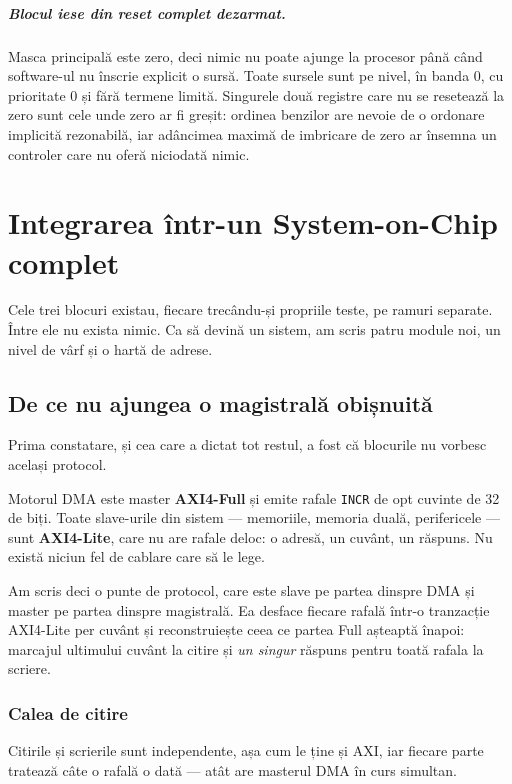 \documentclass[11pt,openany]{report}
\newcommand{\sig}[1]{\texttt{#1}}
\begin{document}
\paragraph{Blocul iese din reset complet dezarmat.} Masca principală este zero,
deci nimic nu poate ajunge la procesor până când software-ul nu înscrie explicit
o sursă. Toate sursele sunt pe nivel, în banda 0, cu prioritate 0 și fără
termene limită. Singurele două registre care nu se resetează la zero sunt cele
unde zero ar fi greșit: ordinea benzilor are nevoie de o ordonare implicită
rezonabilă, iar adâncimea maximă de imbricare de zero ar însemna un controler
care nu oferă niciodată nimic.

\chapter{Integrarea într-un System-on-Chip complet}
\label{ch:integrare}

Cele trei blocuri existau, fiecare trecându-și propriile teste, pe ramuri
separate. Între ele nu exista nimic. Ca să devină un sistem, am scris patru
module noi, un nivel de vârf și o hartă de adrese.

\section{De ce nu ajungea o magistrală obișnuită}
\label{sec:punte}

Prima constatare, și cea care a dictat tot restul, a fost că blocurile nu
vorbesc același protocol.

Motorul DMA este master \textbf{AXI4-Full} și emite rafale \sig{INCR} de opt
cuvinte de 32 de biți. Toate slave-urile din sistem --- memoriile, memoria
duală, perifericele --- sunt \textbf{AXI4-Lite}, care nu are rafale deloc: o
adresă, un cuvânt, un răspuns. Nu există niciun fel de cablare care să le lege.

Am scris deci o punte de protocol, care este slave pe partea dinspre DMA și
master pe partea dinspre magistrală. Ea desface fiecare rafală într-o tranzacție
AXI4-Lite per cuvânt și reconstruiește ceea ce partea Full așteaptă înapoi:
marcajul ultimului cuvânt la citire și \emph{un singur} răspuns pentru toată
rafala la scriere.

\subsection{Calea de citire}

Citirile și scrierile sunt independente, așa cum le ține și AXI, iar fiecare
parte tratează câte o rafală o dată --- atât are masterul DMA în curs simultan.
\end{document}
